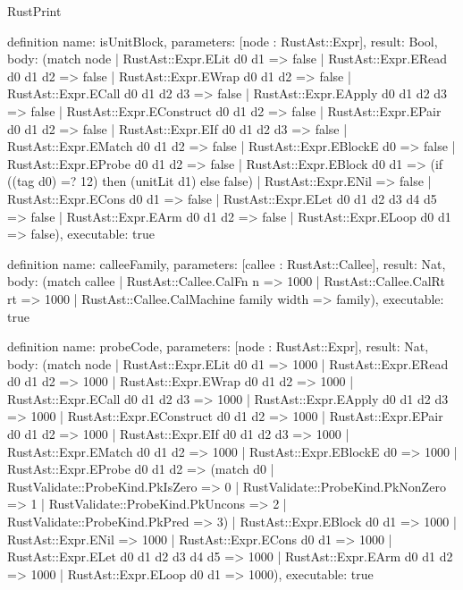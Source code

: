 \begin{lexlean}{RustPrint}
\begin{semanticmodule}
definition{
  name: isUnitBlock,
  parameters: [node : RustAst::Expr],
  result: Bool,
  body: (match node
    | RustAst::Expr.ELit d0 d1 => false
    | RustAst::Expr.ERead d0 d1 d2 => false
    | RustAst::Expr.EWrap d0 d1 d2 => false
    | RustAst::Expr.ECall d0 d1 d2 d3 => false
    | RustAst::Expr.EApply d0 d1 d2 d3 => false
    | RustAst::Expr.EConstruct d0 d1 d2 => false
    | RustAst::Expr.EPair d0 d1 d2 => false
    | RustAst::Expr.EIf d0 d1 d2 d3 => false
    | RustAst::Expr.EMatch d0 d1 d2 => false
    | RustAst::Expr.EBlockE d0 => false
    | RustAst::Expr.EProbe d0 d1 d2 => false
    | RustAst::Expr.EBlock d0 d1 => (if ((tag d0) =? 12) then (unitLit d1) else false)
    | RustAst::Expr.ENil => false
    | RustAst::Expr.ECons d0 d1 => false
    | RustAst::Expr.ELet d0 d1 d2 d3 d4 d5 => false
    | RustAst::Expr.EArm d0 d1 d2 => false
    | RustAst::Expr.ELoop d0 d1 => false),
  executable: true
}

definition{
  name: calleeFamily,
  parameters: [callee : RustAst::Callee],
  result: Nat,
  body: (match callee
    | RustAst::Callee.CalFn n => 1000
    | RustAst::Callee.CalRt rt => 1000
    | RustAst::Callee.CalMachine family width => family),
  executable: true
}

definition{
  name: probeCode,
  parameters: [node : RustAst::Expr],
  result: Nat,
  body: (match node
    | RustAst::Expr.ELit d0 d1 => 1000
    | RustAst::Expr.ERead d0 d1 d2 => 1000
    | RustAst::Expr.EWrap d0 d1 d2 => 1000
    | RustAst::Expr.ECall d0 d1 d2 d3 => 1000
    | RustAst::Expr.EApply d0 d1 d2 d3 => 1000
    | RustAst::Expr.EConstruct d0 d1 d2 => 1000
    | RustAst::Expr.EPair d0 d1 d2 => 1000
    | RustAst::Expr.EIf d0 d1 d2 d3 => 1000
    | RustAst::Expr.EMatch d0 d1 d2 => 1000
    | RustAst::Expr.EBlockE d0 => 1000
    | RustAst::Expr.EProbe d0 d1 d2 => (match d0
      | RustValidate::ProbeKind.PkIsZero => 0
      | RustValidate::ProbeKind.PkNonZero => 1
      | RustValidate::ProbeKind.PkUncons => 2
      | RustValidate::ProbeKind.PkPred => 3)
    | RustAst::Expr.EBlock d0 d1 => 1000
    | RustAst::Expr.ENil => 1000
    | RustAst::Expr.ECons d0 d1 => 1000
    | RustAst::Expr.ELet d0 d1 d2 d3 d4 d5 => 1000
    | RustAst::Expr.EArm d0 d1 d2 => 1000
    | RustAst::Expr.ELoop d0 d1 => 1000),
  executable: true
}


\end{semanticmodule}
\end{lexlean}
